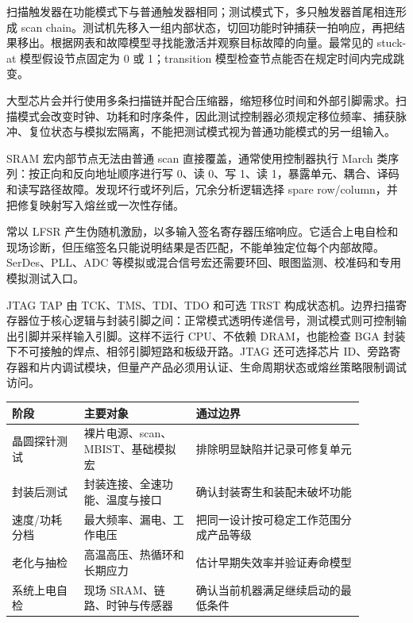
扫描触发器在功能模式下与普通触发器相同；测试模式下，多只触发器首尾相连形成 scan chain。测试机先移入一组内部状态，切回功能时钟捕获一拍响应，再把结果移出。根据网表和故障模型寻找能激活并观察目标故障的向量。最常见的 stuck-at 模型假设节点固定为 0 或 1；transition 模型检查节点能否在规定时间内完成跳变。

大型芯片会并行使用多条扫描链并配合压缩器，缩短移位时间和外部引脚需求。扫描模式会改变时钟、功耗和时序条件，因此测试控制器必须规定移位频率、捕获脉冲、复位状态与模拟宏隔离，不能把测试模式视为普通功能模式的另一组输入。


SRAM 宏内部节点无法由普通 scan 直接覆盖，通常使用控制器执行 March 类序列：按正向和反向地址顺序进行写 0、读 0、写 1、读 1，暴露单元、耦合、译码和读写路径故障。发现坏行或坏列后，冗余分析逻辑选择 spare row/column，并把修复映射写入熔丝或一次性存储。

常以 LFSR 产生伪随机激励，以多输入签名寄存器压缩响应。它适合上电自检和现场诊断，但压缩签名只能说明结果是否匹配，不能单独定位每个内部故障。SerDes、PLL、ADC 等模拟或混合信号宏还需要环回、眼图监测、校准码和专用模拟测试入口。


JTAG TAP 由 TCK、TMS、TDI、TDO 和可选 TRST 构成状态机。边界扫描寄存器位于核心逻辑与封装引脚之间：正常模式透明传递信号，测试模式则可控制输出引脚并采样输入引脚。这样不运行 CPU、不依赖 DRAM，也能检查 BGA 封装下不可接触的焊点、相邻引脚短路和板级开路。JTAG 还可选择芯片 ID、旁路寄存器和片内调试模块，但量产产品必须用认证、生命周期状态或熔丝策略限制调试访问。


\begin{longtable}{L{0.18\linewidth}L{0.28\linewidth}L{0.42\linewidth}}
\toprule
阶段 & 主要对象 & 通过边界 \\
\midrule
晶圆探针测试 & 裸片电源、scan、MBIST、基础模拟宏 & 排除明显缺陷并记录可修复单元 \\\tablerowrule
封装后测试 & 封装连接、全速功能、温度与接口 & 确认封装寄生和装配未破坏功能 \\\tablerowrule
速度/功耗分档 & 最大频率、漏电、工作电压 & 把同一设计按可稳定工作范围分成产品等级 \\\tablerowrule
老化与抽检 & 高温高压、热循环和长期应力 & 估计早期失效率并验证寿命模型 \\\tablerowrule
系统上电自检 & 现场 SRAM、链路、时钟与传感器 & 确认当前机器满足继续启动的最低条件 \\
\bottomrule
\end{longtable}

